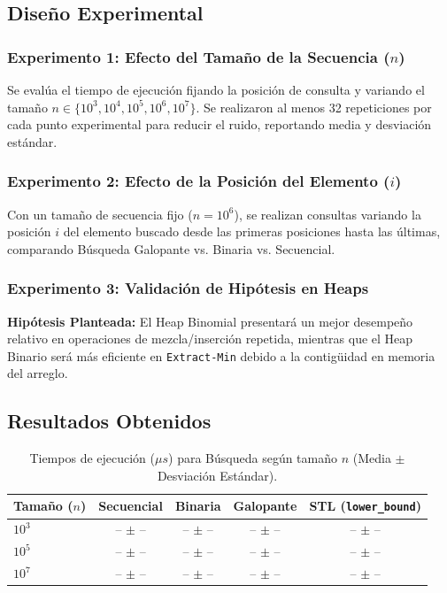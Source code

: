 \documentclass[11pt,a4paper]{article}
\begin{document}
\subsection{Diseño Experimental}

\subsubsection{Experimento 1: Efecto del Tamaño de la Secuencia ($n$)}
Se evalúa el tiempo de ejecución fijando la posición de consulta y variando el tamaño $n \in \{10^3, 10^4, 10^5, 10^6, 10^7\}$. Se realizaron al menos 32 repeticiones por cada punto experimental para reducir el ruido, reportando media y desviación estándar.

\subsubsection{Experimento 2: Efecto de la Posición del Elemento ($i$)}
Con un tamaño de secuencia fijo ($n = 10^6$), se realizan consultas variando la posición $i$ del elemento buscado desde las primeras posiciones hasta las últimas, comparando Búsqueda Galopante vs. Binaria vs. Secuencial.

\subsubsection{Experimento 3: Validación de Hipótesis en Heaps}
\textbf{Hipótesis Planteada:} El Heap Binomial presentará un mejor desempeño relativo en operaciones de mezcla/inserción repetida, mientras que el Heap Binario será más eficiente en \texttt{Extract-Min} debido a la contigüidad en memoria del arreglo.

\subsection{Resultados Obtenidos}

\begin{table}[h!]
    \centering
    \caption{Tiempos de ejecución ($\mu s$) para Búsqueda según tamaño $n$ (Media $\pm$ Desviación Estándar).}
    \label{tab:resultados_busqueda}
    \begin{tabular}{lcccc}
        \toprule
        \textbf{Tamaño ($n$)} & \textbf{Secuencial} & \textbf{Binaria} & \textbf{Galopante} & \textbf{STL (\texttt{lower\_bound})} \\
        \midrule
        $10^3$ & -- $\pm$ -- & -- $\pm$ -- & -- $\pm$ -- & -- $\pm$ -- \\
        $10^5$ & -- $\pm$ -- & -- $\pm$ -- & -- $\pm$ -- & -- $\pm$ -- \\
        $10^7$ & -- $\pm$ -- & -- $\pm$ -- & -- $\pm$ -- & -- $\pm$ -- \\
        \bottomrule
    \end{tabular}
\end{table}
\end{document}
